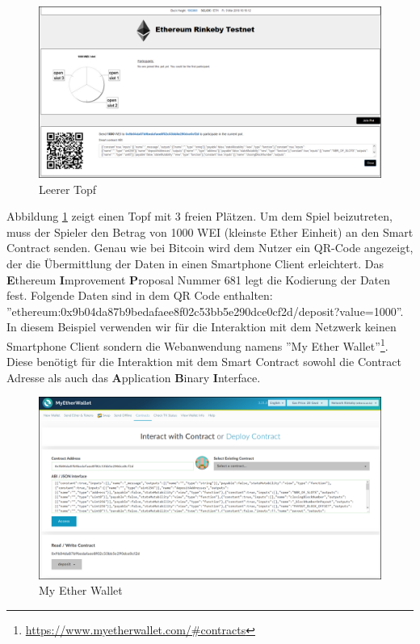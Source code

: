 \begin{figure}[H]
\centering
\includegraphics[width=1\linewidth]{Figures/eth_gui/ETH_pot_empty}
\decoRule
\caption{Leerer Topf}
\label{fig:ETH_pot_empty}
\end{figure}
Abbildung \ref{fig:ETH_pot_empty} zeigt einen Topf mit 3 freien Plätzen. Um dem Spiel beizutreten, muss der Spieler den Betrag von 1000 WEI (kleinste Ether Einheit) an den Smart Contract senden. Genau wie bei Bitcoin wird dem Nutzer ein QR-Code angezeigt, der die Übermittlung der Daten in einen Smartphone Client erleichtert. Das \textbf{E}thereum \textbf{I}mprovement \textbf{P}roposal Nummer 681\citep{eip21} legt die Kodierung der Daten fest.
Folgende Daten sind in dem QR Code enthalten:\\ ''ethereum:0x9b04da87b9bedafaee8f02c53bb5e290dce0cf2d/deposit?value=1000''. In diesem Beispiel verwenden wir für die Interaktion mit dem Netzwerk keinen Smartphone Client sondern die Webanwendung namens ''My Ether Wallet''\footnote{\url{https://www.myetherwallet.com/\#contracts}}. Diese benötigt für die Interaktion mit dem Smart Contract sowohl die Contract Adresse als auch das \textbf{A}pplication \textbf{B}inary \textbf{I}nterface.


\begin{figure}[H]
\centering
\includegraphics[width=1\linewidth]{Figures/eth_gui/ETH_wallet}
\decoRule
\caption{My Ether Wallet}
\label{fig:ETH_wallet}
\end{figure}

